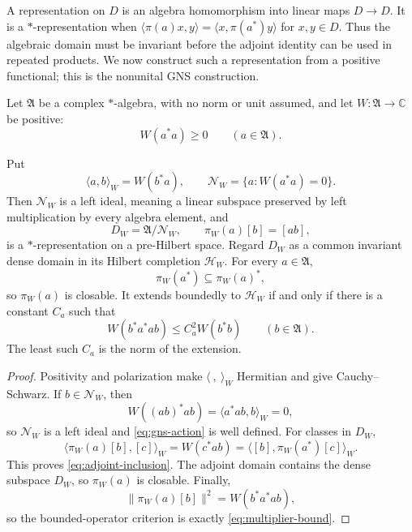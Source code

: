 \documentclass[11pt]{article}
\numberwithin{equation}{section}
\newcommand{\cN}{\mathcal N}
\newcommand{\C}{\mathbb C}
\begin{document}
A representation on $D$ is an algebra homomorphism into linear maps
$D\to D$.  It is a $*$-representation when
$\langle\pi(a)x,y\rangle=\langle x,\pi(a^*)y\rangle$ for $x,y\in D$.
Thus the algebraic domain must be invariant before the adjoint identity
can be used in repeated products.  We now construct such a representation
from a positive functional; this is the nonunital GNS construction.

Let $\mathfrak A$ be a complex $*$-algebra, with no norm or unit assumed,
and let $W:\mathfrak A\to\C$ be positive:
\[
 W(a^*a)\geq0\qquad(a\in\mathfrak A).
\]

\begin{theorem}
\label{thm:gns}
Put
\[
 \langle a,b\rangle_W=W(b^*a),
 \qquad
 \cN_W=\{a:W(a^*a)=0\}.
\]
Then $\cN_W$ is a left ideal, meaning a linear subspace preserved by
left multiplication by every algebra element, and
\begin{equation}
 D_W=\mathfrak A/\cN_W,
 \qquad
 \pi_W(a)[b]=[ab],
 \label{eq:gns-action}
\end{equation}
is a $*$-representation on a pre-Hilbert space.  Regard $D_W$ as a
common invariant dense domain in its Hilbert completion $\mathcal H_W$.
For every $a\in\mathfrak A$,
\begin{equation}
 \pi_W(a^*)\subseteq\pi_W(a)^*,
 \label{eq:adjoint-inclusion}
\end{equation}
so $\pi_W(a)$ is closable.  It extends boundedly to $\mathcal H_W$ if
and only if there is a constant $C_a$ such that
\begin{equation}
 W(b^*a^*ab)\leq C_a^2W(b^*b)
 \qquad(b\in\mathfrak A).
 \label{eq:multiplier-bound}
\end{equation}
The least such $C_a$ is the norm of the extension.
\end{theorem}

\begin{proof}
Positivity and polarization make $\langle\ ,\ \rangle_W$ Hermitian and
give Cauchy--Schwarz.  If $b\in\cN_W$, then
\[
 W((ab)^*ab)=\langle a^*ab,b\rangle_W=0,
\]
so $\cN_W$ is a left ideal and \eqref{eq:gns-action} is well defined.
For classes in $D_W$,
\[
 \langle\pi_W(a)[b],[c]\rangle_W
 =W(c^*ab)
 =\langle[b],\pi_W(a^*)[c]\rangle_W.
\]
This proves \eqref{eq:adjoint-inclusion}.  The adjoint domain contains
the dense subspace $D_W$, so $\pi_W(a)$ is closable.  Finally,
\[
 \|\pi_W(a)[b]\|^2=W(b^*a^*ab),
\]
so the bounded-operator criterion is exactly
\eqref{eq:multiplier-bound}.
\end{proof}
\end{document}
